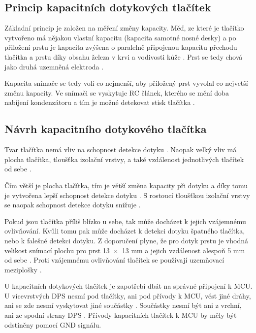 \subsection{Princip kapacitních dotykových tlačítek}
Základní princip je založen na měření změny kapacity. Měď, ze které je tlačítko vytvořeno má
nějakou vlastní kapacitu (kapacita samotné nosné desky) a po přiložení prstu je kapacita zvýšena o paralelně 
připojenou kapacitu přechodu tlačítka a prstu díky obsahu železa v krvi a vodivosti kůže \cite{PrincipKapTl}. 
Prst se tedy chová jako druhá uzemněná elektroda \cite{PrincipKapTl}. 

Kapacita snímače se tedy volí co nejmenší, aby přiložený prst vyvolal co nejvetší změnu kapacity. Ve snímači se vyskytuje
RC článek, kterého se mění doba nabíjení kondenzátoru a tím je možné detekovat stisk tlačítka \cite{PrincipKapTl}. 

\subsection{Návrh kapacitního dotykového tlačítka}
Tvar tlačítka nemá vliv na schopnost detekce dotyku \cite{PrincipKapTl}. Naopak velký vliv má plocha tlačítka, tloušťka
izolační vrstvy, a také vzdálenost jednotlivých tlačítek od sebe \cite{PrincipKapTl}. 

Čím větší je plocha tlačítka, tím je větší změna kapacity při dotyku a díky tomu je vytvořena lepší schopnost detekce 
dotyku \cite{PrincipKapTl}. S rostoucí tloušťkou izolační vrstvy se naopak schopnost detekce dotyku snižuje \cite{PrincipKapTl}.

Pokud jsou tlačítka příliš blízko u sebe, tak může docházet k jejich vzájemnému ovlivňování. Kvůli tomu pak může docházet k
detekci dotyku špatného tlačítka, nebo k falešné detekci dotyku. Z doporučení plyne, že pro dotyk prstu je vhodná velikost snímací 
plochu pro prst 13~$\times$~13 mm a jejich vzdálenost alespoň 5 mm od sebe \cite{PrincipKapTl}. Proti vzájemnému ovlivňování tlačítek
se používají uzemňovací meziplošky \cite{PrincipKapTl}. 


U kapacitních dotykových tlačítek je zapotřebí dbát na správné připojení k MCU. U vícevrstvých DPS nesmí pod tlačítky, ani pod přívody
k MCU, vést jiné dráhy, ani se zde nesmí vyskytovat jiné součástky \cite{PrincipKapTl}. Součástky nesmí být ani z vrchní, ani ze spodní 
strany DPS \cite{PrincipKapTl}. Přívody kapacitních tlačítek k MCU by měly být odstíněny pomocí GND signálu.

